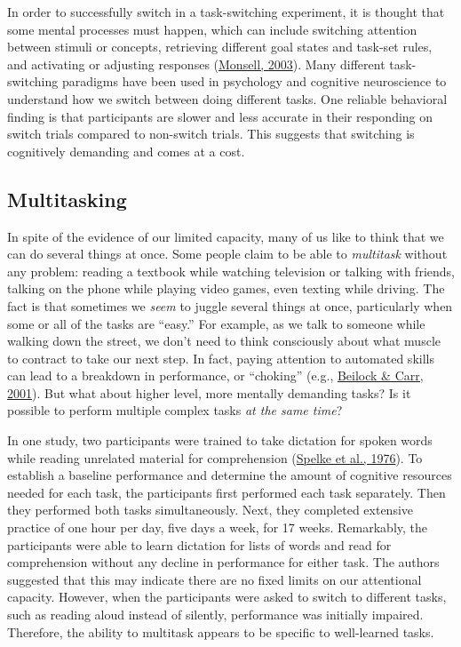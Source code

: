 \documentclass[
]{krantz}
\begin{document}
In order to successfully switch in a task-switching experiment, it is thought that some mental processes must happen, which can include switching attention between stimuli or concepts, retrieving different goal states and task-set rules, and activating or adjusting responses (\protect\hyperlink{ref-Monsell2003}{Monsell, 2003}). Many different task-switching paradigms have been used in psychology and cognitive neuroscience to understand how we switch between doing different tasks. One reliable behavioral finding is that participants are slower and less accurate in their responding on switch trials compared to non-switch trials. This suggests that switching is cognitively demanding and comes at a cost.

\hypertarget{multitasking}{%
\subsection*{Multitasking}\label{multitasking}}


In spite of the evidence of our limited capacity, many of us like to think that we can do several things at once. Some people claim to be able to \emph{multitask} without any problem: reading a textbook while watching television or talking with friends, talking on the phone while playing video games, even texting while driving. The fact is that sometimes we \emph{seem} to juggle several things at once, particularly when some or all of the tasks are ``easy.'' For example, as we talk to someone while walking down the street, we don't need to think consciously about what muscle to contract to take our next step. In fact, paying attention to automated skills can lead to a breakdown in performance, or ``choking'' (e.g., \protect\hyperlink{ref-Beilock2001}{Beilock \& Carr, 2001}). But what about higher level, more mentally demanding tasks? Is it possible to perform multiple complex tasks \emph{at the same time}?

In one study, two participants were trained to take dictation for spoken words while reading unrelated material for comprehension (\protect\hyperlink{ref-Spelke1976}{Spelke et al., 1976}). To establish a baseline performance and determine the amount of cognitive resources needed for each task, the participants first performed each task separately. Then they performed both tasks simultaneously. Next, they completed extensive practice of one hour per day, five days a week, for 17 weeks. Remarkably, the participants were able to learn dictation for lists of words and read for comprehension without any decline in performance for either task. The authors suggested that this may indicate there are no fixed limits on our attentional capacity. However, when the participants were asked to switch to different tasks, such as reading aloud instead of silently, performance was initially impaired. Therefore, the ability to multitask appears to be specific to well-learned tasks.
\end{document}
